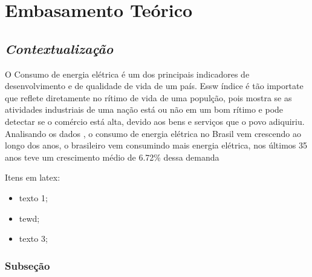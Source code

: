 \chapter[Embasamento Teórico]{Embasamento Teórico}
\label{ch:cap2}
\section[\textit{Contextualizacao}]{\textit{Contextualização}}\label{context}
O Consumo de energia elétrica é um dos principais indicadores de desenvolvimento e de qualidade de vida 
de um país. Essw índice é tão importate que reflete diretamente no rítimo de vida de uma populção, pois mostra
se as atividades industriais de uma nação está ou não em um bom rítimo e pode detectar se o comércio está alta,
devido aos bens e serviços que o povo adiquiriu. Analisando os dados \cite{epe-balanco-final}, o consumo de energia
elétrica no Brasil vem crescendo ao longo dos anos, o brasileiro vem consumindo mais energia elétrica, nos últimos
35 anos teve um crescimento médio de 6.72\% dessa demanda 

Itens em latex:
\begin{itemize}
	\item texto 1;
	\item tewd;
	\item texto 3;
\end{itemize}

\lipsum[2-3]

\subsection{Subseção}

\lipsum[2-4]